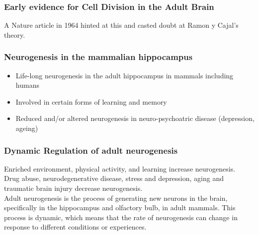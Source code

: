 \begin{itemize}
\begin{itemize}
\subsubsection{Early evidence for Cell Division in the Adult Brain}
A Nature article in 1964 hinted at this and casted doubt at Ramon y Cajal's theory.
\subsubsection{Neurogenesis in the mammalian hippocampus}
\begin{itemize}
    \item Life-long neurogenesis in the adult hippocampus in mammals including humans
    \item Involved in certain forms of learning and memory
    \item Reduced and/or altered neurogenesis in neuro-psychoatric disease (depression, ageing)
\end{itemize}

\subsubsection{Dynamic Regulation of adult neurogenesis}
Enriched environment, physical activity, and learning increase neurogenesis. 
\\Drug abuse, neurodegenerative disease, stress and depression, aging and traumatic brain injury decrease neurogenesis.
\\Adult neurogenesis is the process of generating new neurons in the brain, specifically in the hippocampus and olfactory bulb, in adult mammals. This process is dynamic, which means that the rate of neurogenesis can change in response to different conditions or experiences.


\end{itemize}
\end{itemize}
